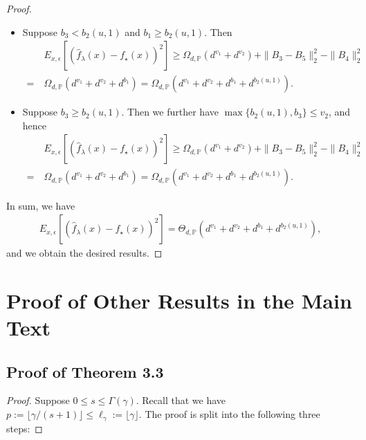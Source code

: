 \documentclass{article}
\theoremstyle{plain}
\theoremstyle{definition}
\theoremstyle{remark}
\begin{document}
\begin{appendix}
\begin{proof}
\begin{itemize}
\begin{itemize}
    \item Suppose $b_3 < b_2(u, 1)$ and $b_1 \geq b_2(u, 1)$. Then
    \begin{align*}
  &~  E_{x, \epsilon} \left[ \left(\hat{f}_{\lambda}(x) - f_{\star}(x) \right)^{2} \right]
\geq 
\Omega_{d, \mathbb{P}} \left( d^{v_1} + d^{v_2}\right) + \|B_3 - B_5\|_{2}^{2} - \|B_4\|_{2}^{2} \\
=&~  \Omega_{d, \mathbb{P}}\left( d^{v_1} + d^{v_2} + d^{b_1}\right) = \Omega_{d, \mathbb{P}}\left( d^{v_1} + d^{v_2} + d^{b_1} + d^{b_2(u, 1)}\right).
\end{align*}

    \item Suppose $b_3 \geq b_2(u, 1)$. Then we further have $\max\{b_2(u, 1), b_3\} \leq v_2$, and hence
    \begin{align*}
  &~  E_{x, \epsilon} \left[ \left(\hat{f}_{\lambda}(x) - f_{\star}(x) \right)^{2} \right]
\geq 
\Omega_{d, \mathbb{P}} \left( d^{v_1} + d^{v_2}\right) + \|B_3 - B_5\|_{2}^{2} - \|B_4\|_{2}^{2} \\
=&~  \Omega_{d, \mathbb{P}}\left( d^{v_1} + d^{v_2} + d^{b_1}\right) = \Omega_{d, \mathbb{P}}\left( d^{v_1} + d^{v_2} + d^{b_1} + d^{b_2(u, 1)}\right).
\end{align*}
\end{itemize}
\end{itemize}
In sum, we have
\begin{align*}
   E_{x, \epsilon} \left[ \left(\hat{f}_{\lambda}(x) - f_{\star}(x) \right)^{2} \right]
= 
\Theta_{d, \mathbb{P}}\left( d^{v_1} + d^{v_2} + d^{b_1} + d^{b_2(u, 1)}\right),
\end{align*}
and we obtain the desired results.
\end{proof}





\section{Proof of Other Results in the Main Text}\label{appendix_proof_other_results}




\subsection{Proof of Theorem 3.3}

\begin{proof}
 Suppose $0  \leq s \leq \Gamma(\gamma)$. 
Recall that we have $p := \lfloor \gamma/(s+1) \rfloor \leq \ell_{\gamma} := \lfloor \gamma \rfloor$. 
The proof is split into the following three steps:



\end{proof}
\end{appendix}
\end{document}
